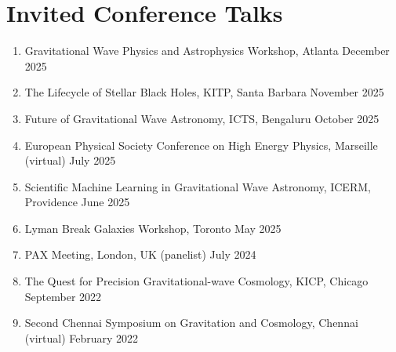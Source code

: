 		
		\section{Invited Conference Talks}
		\begin{enumerate}[leftmargin=*]
			\item Gravitational Wave Physics and Astrophysics Workshop, Atlanta \hfill December 2025
			\item The Lifecycle of Stellar Black Holes, KITP, Santa Barbara \hfill November 2025
			\item Future of Gravitational Wave Astronomy, ICTS, Bengaluru \hfill October 2025
			\item European Physical Society Conference on High Energy Physics, Marseille (virtual) \hfill July 2025
			\item Scientific Machine Learning in Gravitational Wave Astronomy, ICERM, Providence \hfill June 2025
			\item Lyman Break Galaxies Workshop, Toronto \hfill May 2025
			\item PAX Meeting, London, UK (panelist) \hfill July 2024 
			\item The Quest for Precision Gravitational-wave Cosmology, KICP, Chicago \hfill September 2022
			\item {Second Chennai Symposium on Gravitation and Cosmology}, Chennai (virtual) \hfill February 2022

		\end{enumerate}


